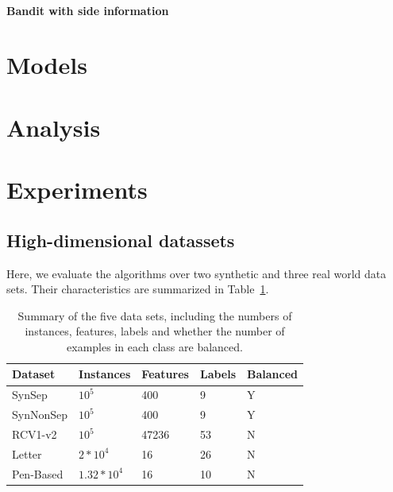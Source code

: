 \documentclass[preprint,12pt,authoryear]{elsarticle}
\begin{document}
\paragraph{Bandit with side information}




\section{Models}

\section{Analysis}

\section{Experiments}

\subsection{High-dimensional datassets}
\label{subsec:BPAE}
Here, we evaluate the algorithms over two synthetic and three real world data sets. Their characteristics are summarized in Table~\ref{table:mce}.

\begin{table}[h]
	\caption{Summary of the five data sets, including the numbers of instances, features, labels and whether the number of examples in each class are balanced.}
	\label{table:mce}
	\begin{center}
		\begin{tabular}{l l l l l}
			{\bf Dataset}  & {\bf Instances} & {\bf Features} & {\bf Labels}& {\bf Balanced}\\
			\hline
			SynSep & $10^5$ 	& 400 	& 9 & Y\\
			
			SynNonSep & $10^5$ & 400 	& 9 & Y\\
			
			RCV1-v2  & $10^5$ 	& 47236 	& 53 & N\\
			
			Letter 	&$2*10^4$	&16	&26	&N\\
			
			Pen-Based &$1.32*10^4$	&16	&10	&N\\
		\end{tabular}
	\end{center}
\end{table}
\end{document}
